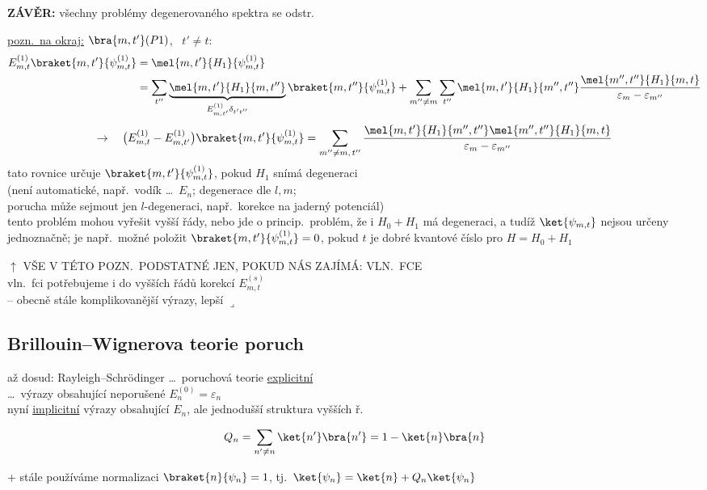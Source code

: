 \textbf{ZÁVĚR:} všechny problémy degenerovaného spektra se odstr.

\underline{pozn.\ na okraj:} \quad $\bra{m,t'}(P1)$, \ $t'\neq t$:
\begin{align*}
  E_{m,t}^{(1)}\braket{m,t'}{\psi_{m,t}^{(1)}} &= \mel{m,t'}{H_1}{\psi_{m,t}^{(1)}} \\
  &= \sum_{t''}\underbrace{\mel{m,t'}{H_1}{m,t''}}_{E_{m,t'}^{(1)}\delta_{t't''}}\braket{m,t''}{\psi_{m,t}^{(1)}}
   + \sum_{m''\neq m}\sum_{t''}\mel{m,t'}{H_1}{m'',t''}\frac{\mel{m'',t''}{H_1}{m,t}}{\varepsilon_m - \varepsilon_{m''}}
\end{align*}
\[
  \to\quad \big(E_{m,t}^{(1)} - E_{m,t'}^{(1)}\big)\braket{m,t'}{\psi_{m,t}^{(1)}} = \sum_{m''\neq m,\,t''}\frac{\mel{m,t'}{H_1}{m'',t''}\mel{m'',t''}{H_1}{m,t}}{\varepsilon_m - \varepsilon_{m''}}
\]
tato rovnice určuje $\braket{m,t'}{\psi_{m,t}^{(1)}}$, pokud $H_1$ snímá degeneraci \\
\quad (není automatické, např.\ vodík \dots\ $E_n$; degenerace dle $l, m$; \\
\quad porucha může sejmout jen $l$-degeneraci, např.\ korekce na jaderný potenciál) \\
tento problém mohou vyřešit vyšší řády, nebo jde o princip.\ problém, že i $H_0 + H_1$ má degeneraci, a tudíž $\ket{\psi_{m,t}}$ nejsou určeny jednoznačně; je např.\ možné položit $\braket{m,t'}{\psi_{m,t}^{(1)}} = 0$, pokud $t$ je dobré kvantové číslo pro $H = H_0 + H_1$

$\uparrow$ VŠE V TÉTO POZN.\ PODSTATNÉ JEN, POKUD NÁS ZAJÍMÁ: VLN.\ FCE \\
vln.\ fci potřebujeme i do vyšších řádů korekcí $E_{m,t}^{(s)}$ \\
\quad -- obecně stále komplikovanější výrazy, lepší $\lrcorner$

\subsection{Brillouin--Wignerova teorie poruch}
až dosud: Rayleigh--Schrödinger \dots\ poruchová teorie \underline{explicitní} \\
\hspace*{5cm} \dots\ výrazy obsahující neporušené $E_n^{(0)} = \varepsilon_n$ \\
nyní \underline{implicitní} výrazy obsahující $E_n$, ale jednodušší struktura vyšších ř.

\begin{definice}
\[ Q_n = \sum_{n'\neq n}\ket{n'}\bra{n'} = 1 - \ket{n}\bra{n} \]
\end{definice}
+ stále používáme normalizaci $\braket{n}{\psi_n} = 1$, \quad tj.\ $\ket{\psi_n} = \ket{n} + Q_n\ket{\psi_n}$

